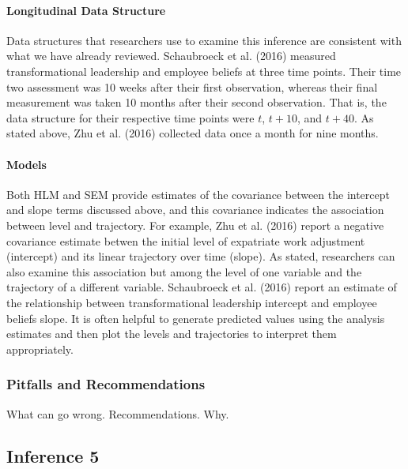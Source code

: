 \documentclass[english,,man]{apa6}
\let\oldparagraph\paragraph
\renewcommand{\paragraph}[1]{\oldparagraph{#1}\mbox{}}
\theoremstyle{definition}
\theoremstyle{definition}
\theoremstyle{definition}
\theoremstyle{remark}
\begin{document}
\hypertarget{longitudinal-data-structure-4}{%
\paragraph{Longitudinal Data
Structure}\label{longitudinal-data-structure-4}}

Data structures that researchers use to examine this inference are
consistent with what we have already reviewed. Schaubroeck et al. (2016)
measured transformational leadership and employee beliefs at three time
points. Their time two assessment was 10 weeks after their first
observation, whereas their final measurement was taken 10 months after
their second observation. That is, the data structure for their
respective time points were \(t\), \(t + 10\), and \(t + 40\). As stated
above, Zhu et al. (2016) collected data once a month for nine months.

\hypertarget{models-4}{%
\paragraph{Models}\label{models-4}}

Both HLM and SEM provide estimates of the covariance between the
intercept and slope terms discussed above, and this covariance indicates
the association between level and trajectory. For example, Zhu et al.
(2016) report a negative covariance estimate betwen the initial level of
expatriate work adjustment (intercept) and its linear trajectory over
time (slope). As stated, researchers can also examine this association
but among the level of one variable and the trajectory of a different
variable. Schaubroeck et al. (2016) report an estimate of the
relationship between transformational leadership intercept and employee
beliefs slope. It is often helpful to generate predicted values using
the analysis estimates and then plot the levels and trajectories to
interpret them appropriately.

\hypertarget{pitfalls-and-recommendations-4}{%
\subsubsection{Pitfalls and
Recommendations}\label{pitfalls-and-recommendations-4}}

What can go wrong. Recommendations. Why.

\hypertarget{inference-5}{%
\subsection{Inference 5}\label{inference-5}}
\end{document}
